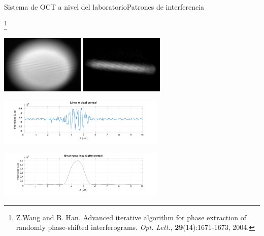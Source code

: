 \documentclass[fleqn,10pt]{beamer}
\newcommand\blfootnote[1]{%
	\begingroup
	\renewcommand\thefootnote{}\footnote{#1}%
	\addtocounter{footnote}{-1}%
	\endgroup
}
\begin{document}
\begin{frame}{Sistema de OCT a nivel del laboratorio}{Patrones de interferencia}
	
	\blfootnote{{\tiny Z.Wang and B. Han. Advanced iterative algorithm for phase extraction of randomly phase-shifted interferograms. \emph{Opt. Lett.}, \textbf{29}(14):1671-1673, 2004.}}
	
	\vspace*{-0.7cm}
	\begin{center}
		\includegraphics[width=4cm]{AAUgraphics/pt2/PatronInterferencia}
		\hspace*{0.05cm}\pause
		\includegraphics[width=4cm]{AAUgraphics/pt2/Modulacion}\par
		
		\pause
		\includegraphics[width=8cm]{AAUgraphics/pt2/LineaAPXCenter} \par
		\vspace*{-0.2cm}
		\includegraphics[width=8cm]{AAUgraphics/pt2/LineaAPXCenterEnvelop}
	\end{center}
	
\end{frame}
\end{document}
